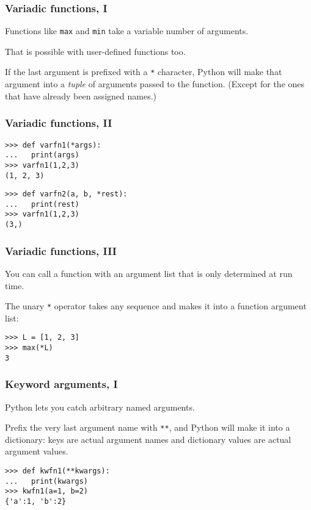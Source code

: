 \begin{frame}[fragile]
  \frametitle{Variadic functions, I}
  Functions like \texttt{max} and \texttt{min} take a variable number of arguments.

  \+
  That is possible with user-defined functions too.

  \+
  If the last argument is prefixed with a \texttt{*} character,
  Python will make that argument into a \emph{tuple} of arguments
  passed to the function. (Except for the ones that have already been
  assigned names.)
\end{frame}


\begin{frame}
  \frametitle{Variadic functions, II}
\begin{lstlisting}
>>> def varfn1(*args):
...   print(args)
>>> varfn1(1,2,3)
(1, 2, 3)
\end{lstlisting}

\begin{lstlisting}
>>> def varfn2(a, b, *rest):
...   print(rest)
>>> varfn1(1,2,3)
(3,)
\end{lstlisting}
\end{frame}


\begin{frame}[fragile]
  \frametitle{Variadic functions, III}
  You can call a function with an argument list that is only
  determined at run time.

  \+
  The unary \texttt{*} operator takes any sequence and makes it
  into a function argument list:
\begin{lstlisting}
>>> L = [1, 2, 3]
>>> max(*L)
3
\end{lstlisting}
\end{frame}


\begin{frame}[fragile]
  \frametitle{Keyword arguments, I}
  Python lets you catch arbitrary named arguments.

  \+
  Prefix the very last argument name with \texttt{**}, and Python
  will make it into a dictionary: keys are actual argument names and
  dictionary values are actual argument values.

  \+
\begin{lstlisting}
>>> def kwfn1(**kwargs):
...   print(kwargs)
>>> kwfn1(a=1, b=2)
{'a':1, 'b':2}
\end{lstlisting}
\end{frame}


